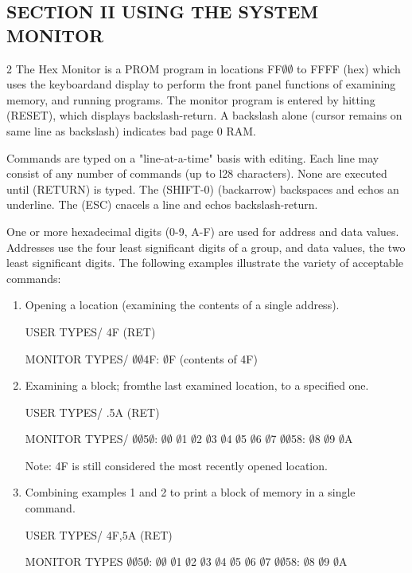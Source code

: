 \documentclass[letterpaper]{article}
\begin{document}
\newpage
\begin{center}
\section{SECTION II
USING THE SYSTEM MONITOR}
\end{center}
\begin{multicols}{2}
The Hex Monitor is a PROM program in locations FF$\emptyset$$\emptyset$ to FFFF (hex) which uses the keyboardand display to perform the front panel functions of examining memory, and running programs. The monitor program is entered by hitting (RESET), which displays backslash-return. A backslash alone (cursor remains on same line as backslash) indicates bad page 0 RAM.

Commands are typed on a "line-at-a-time" basis with editing. Each line may consist of any number of commands (up to l28 characters). None are executed until (RETURN) is typed. The (SHIFT-0) (backarrow) backspaces and echos an underline. The (ESC) cnacels a line and echos backslash-return.

One or more hexadecimal digits (0-9, A-F) are used for address and data values. Addresses use the four least significant digits of a group, and data values, the two least significant digits. The following examples illustrate the variety of acceptable commands:
\begin{enumerate}
\item Opening a location (examining the contents of a single address).

USER TYPES/ 4F (RET)

MONITOR TYPES/ $\emptyset$$\emptyset$4F: $\emptyset$F (contents of 4F)

\item Examining a block; fromthe last examined location, to a specified one.

USER TYPES/ .5A (RET)

MONITOR TYPES/ $\emptyset$$\emptyset$5$\emptyset$: $\emptyset$$\emptyset$ $\emptyset$1 $\emptyset$2 $\emptyset$3 $\emptyset$4 $\emptyset$5 $\emptyset$6 $\emptyset$7 $\emptyset$$\emptyset$58: $\emptyset$8 $\emptyset$9 $\emptyset$A 

Note: 4F is still considered the most recently opened location.

\item Combining examples 1 and 2 to print a block of memory in a single command.

USER TYPES/ 4F,5A (RET)

MONITOR TYPES  $\emptyset$$\emptyset$5$\emptyset$: $\emptyset$$\emptyset$ $\emptyset$1 $\emptyset$2 $\emptyset$3 $\emptyset$4 $\emptyset$5 $\emptyset$6 $\emptyset$7 $\emptyset$$\emptyset$58: $\emptyset$8 $\emptyset$9 $\emptyset$A 


\end{enumerate}
\end{multicols}
\end{document}
